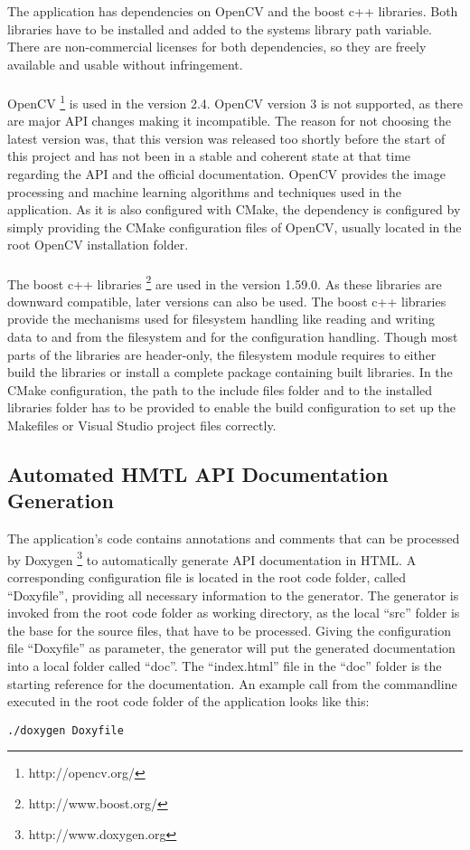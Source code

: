 The application has dependencies on OpenCV and the boost c++ libraries. Both libraries have to be installed and added to the systems library path variable. There are non-commercial licenses for both dependencies, so they are freely available and usable without infringement.
\\
\\
OpenCV \footnote{http://opencv.org/} is used in the version 2.4. OpenCV version 3 is not supported, as there are major API changes making it incompatible. The reason for not choosing the latest version was, that this version was released too shortly before the start of this project and has not been in a stable and coherent state at that time regarding the API and the official documentation. OpenCV provides the image processing and machine learning algorithms and techniques used in the application. As it is also configured with CMake, the dependency is configured by simply providing the CMake configuration files of OpenCV, usually located in the root OpenCV installation folder.
\\
\\
The boost c++ libraries \footnote{http://www.boost.org/} are used in the version 1.59.0. As these libraries are downward compatible, later versions can also be used. The boost c++ libraries provide the mechanisms used for filesystem handling like reading and writing data to and from the filesystem and for the configuration handling. Though most parts of the libraries are header-only, the filesystem module requires to either build the libraries or install a complete package containing built libraries. In the CMake configuration, the path to the include files folder and to the installed libraries folder has to be provided to enable the build configuration to set up the Makefiles or Visual Studio project files correctly.


\subsection{Automated HMTL API Documentation Generation}

The application's code contains annotations and comments that can be processed by Doxygen \footnote{http://www.doxygen.org} to automatically generate API documentation in HTML. A corresponding configuration file is located in the root code folder, called "`Doxyfile"', providing all necessary information to the generator. The generator is invoked from the root code folder as working directory, as the local "`src"' folder is the base for the source files, that have to be processed. Giving the configuration file "`Doxyfile"' as parameter, the generator will put the generated documentation into a local folder called "`doc"'. The "`index.html"' file in the "`doc"' folder is the starting reference for the documentation. An example call from the commandline executed in the root code folder of the application looks like this:
\begin{verbatim}
./doxygen Doxyfile
\end{verbatim}


